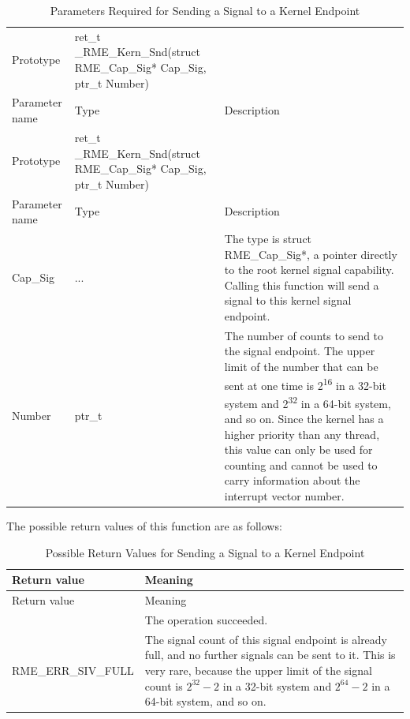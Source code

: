 \begin{xltabular}{\textwidth}{@{}>{\hsize\raggedright\arraybackslash}X>{\hsize\raggedright\arraybackslash}X>{\hsize\raggedright\arraybackslash}X@{}}
\caption{Parameters Required for Sending a Signal to a Kernel Endpoint}\label{tab:7-25-send-signal-to-kernel-endpoint-parameters}\\
\toprule
Prototype & ret\_t \_RME\_Kern\_Snd(struct RME\_Cap\_Sig* Cap\_Sig, ptr\_t
Number) &\tabularnewline
Parameter name & Type & Description\tabularnewline
\endfirsthead
\toprule
Prototype & ret\_t \_RME\_Kern\_Snd(struct RME\_Cap\_Sig* Cap\_Sig, ptr\_t
Number) &\tabularnewline
Parameter name & Type & Description\tabularnewline
\midrule
\endhead
\bottomrule
\endlastfoot
Cap\_Sig & ... & The type is struct
RME\_Cap\_Sig*, a pointer directly to the root kernel signal capability. Calling this function will send a signal to this kernel signal endpoint.\tabularnewline
Number & ptr\_t &
The number of counts to send to the signal endpoint. The upper limit of the number that can be sent at one time is 2\textsuperscript{16} in a 32-bit system and 2\textsuperscript{32} in a 64-bit system, and so on. Since the kernel has a higher priority than any thread, this value can only be used for counting and cannot be used to carry information about the interrupt vector number.\tabularnewline
\end{xltabular}
\nopagebreak[4]

The possible return values of this function are as follows:

\begin{xltabular}{\textwidth}{@{}>{\hsize\raggedright\arraybackslash}X>{\hsize\raggedright\arraybackslash}X@{}}
\caption{Possible Return Values for Sending a Signal to a Kernel Endpoint}\label{tab:7-26-send-signal-to-kernel-endpoint-return-values}\\
\toprule
Return value & Meaning\tabularnewline
\endfirsthead
\toprule
Return value & Meaning\tabularnewline
\midrule
\endhead
\bottomrule
{} & The operation succeeded.\tabularnewline
    RME\_ERR\_SIV\_FULL & The signal count of this signal endpoint is already full, and no further signals can be sent to it. This is very rare, because the upper limit of the signal count is $2^{32}-2$ in a 32-bit system and $2^{64}-2$ in a 64-bit system, and so on.\tabularnewline
\end{xltabular}
\nopagebreak[4]

